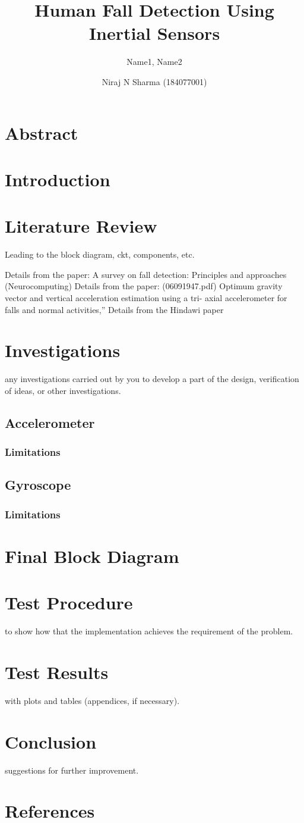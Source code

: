 \documentclass[11pt, a4paper]{article}
\title{Human Fall Detection Using Inertial Sensors}
\author{Name1, Name2 \and Niraj N Sharma (184077001)}
\begin{document}
\maketitle
\section*{Abstract}

\section{Introduction}

\section{Literature Review}
Leading to the block diagram, ckt, components, etc.

Details from the paper: A survey on fall detection: Principles and approaches (Neurocomputing)
Details from the paper: (06091947.pdf) Optimum gravity vector and vertical acceleration estimation using a tri- axial accelerometer for falls and normal activities,” 
Details from the Hindawi paper

\section{Investigations}
any investigations carried out by you to develop a part of the design, verification of ideas, or other investigations.
\subsection{Accelerometer}
\subsubsection{Limitations}
\subsection{Gyroscope}
\subsubsection{Limitations}

\section{Final Block Diagram}

\section{Test Procedure}
to show how that the implementation achieves the requirement of the problem.

\section{Test Results}
with plots and tables (appendices, if necessary).

\section{Conclusion}
suggestions for further improvement.

\section{References}
\end{document}
